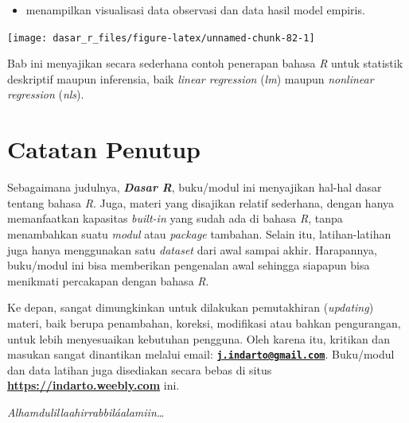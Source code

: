 \documentclass[
  12pt,
  a4paper,
]{scrbook}
\newenvironment{Shaded}{\begin{snugshade}}{\end{snugshade}}
\newcommand{\DataTypeTok}[1]{\textcolor[rgb]{0.13,0.29,0.53}{#1}}
\newcommand{\KeywordTok}[1]{\textcolor[rgb]{0.13,0.29,0.53}{\textbf{#1}}}
\newcommand{\NormalTok}[1]{#1}
\newcommand{\OperatorTok}[1]{\textcolor[rgb]{0.81,0.36,0.00}{\textbf{#1}}}
\newcommand{\StringTok}[1]{\textcolor[rgb]{0.31,0.60,0.02}{#1}}
\providecommand{\tightlist}{%
  \setlength{\itemsep}{0pt}\setlength{\parskip}{0pt}}
\begin{document}
\begin{itemize}
\tightlist
\item
  menampilkan visualisasi data observasi dan data hasil model empiris.
\end{itemize}

\begin{Shaded}
\end{Shaded}

\texttt{[image: dasar\_r\_files/figure-latex/unnamed-chunk-82-1]}

Bab ini menyajikan secara sederhana contoh penerapan bahasa \emph{R}
untuk statistik deskriptif maupun inferensia, baik \emph{linear
regression} (\emph{lm}) maupun \emph{nonlinear regression} (\emph{nls}).

\newpage

\hypertarget{catatan-penutup}{%
\chapter*{Catatan Penutup}\label{catatan-penutup}}

Sebagaimana judulnya, \textbf{\emph{Dasar R}}, buku/modul ini menyajikan
hal-hal dasar tentang bahasa \emph{R}. Juga, materi yang disajikan
relatif sederhana, dengan hanya memanfaatkan kapasitas \emph{built-in}
yang sudah ada di bahasa \emph{R}, tanpa menambahkan suatu \emph{modul}
atau \emph{package} tambahan. Selain itu, latihan-latihan juga hanya
menggunakan satu \emph{dataset} dari awal sampai akhir. Harapannya,
buku/modul ini bisa memberikan pengenalan awal sehingga siapapun bisa
menikmati percakapan dengan bahasa \emph{R}.

Ke depan, sangat dimungkinkan untuk dilakukan pemutakhiran
(\emph{updating}) materi, baik berupa penambahan, koreksi, modifikasi
atau bahkan pengurangan, untuk lebih menyesuaikan kebutuhan pengguna.
Oleh karena itu, kritikan dan masukan sangat dinantikan melalui email:
\textbf{\href{mailto:j.indarto@gmail.com}{\nolinkurl{j.indarto@gmail.com}}}.
Buku/modul dan data latihan juga disediakan secara bebas di situs
\textbf{\url{https://indarto.weebly.com}} ini.

\emph{Alhamdulillaahirrabbiláalamiin\ldots{}}

\backmatter
\renewcommand\bibname{References}
  
\end{document}
